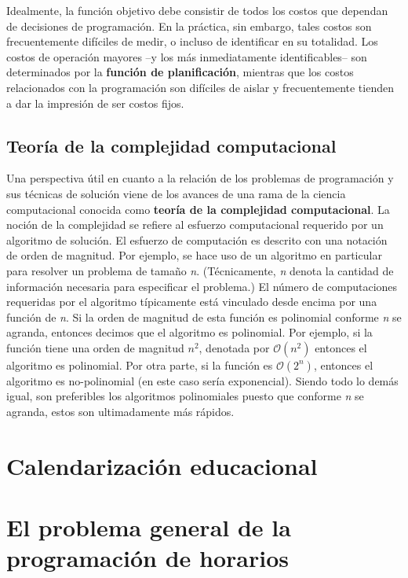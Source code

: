 \documentclass[draft,12pt,headsepline,footsepline,paper=letter]{scrreprt}
\newcommand{\BigO}{\ensuremath{\mathcal{O}}}%
\begin{document}
Idealmente, la función objetivo debe consistir de todos los costos que dependan de decisiones de programación. En la práctica, sin embargo, tales costos son frecuentemente difíciles de medir, o incluso de identificar en su totalidad. Los costos de operación mayores –y los más inmediatamente identificables– son determinados por la \textbf{función de planificación}, mientras que los costos relacionados con la programación son difíciles de aislar y frecuentemente tienden a dar la impresión de ser costos fijos.
%


\subsection{Teoría de la complejidad computacional} %
\label{sub:teoria_complejidad_computacional}

Una perspectiva útil en cuanto a la relación de los problemas de programación y sus técnicas de solución viene de los avances de una rama de la ciencia computacional conocida como \textbf{teoría de la complejidad computacional}. La noción de la complejidad se refiere al esfuerzo computacional requerido por un algoritmo de solución. El esfuerzo de computación es descrito con una notación de orden de magnitud.
%
Por ejemplo, se hace uso de un algoritmo en particular para resolver un problema de tamaño \textit{n}. (Técnicamente, \textit{n} denota la cantidad de información necesaria para especificar el problema.) El número de computaciones requeridas por el algoritmo típicamente está vinculado desde encima por una función de \textit{n}. Si la orden de magnitud de esta función es polinomial conforme \textit{n} se agranda, entonces decimos que el algoritmo es polinomial.
%
Por ejemplo, si la función tiene una orden de magnitud $\textit{n}^2$, denotada por $\BigO(\textit{n}^2)$ entonces el algoritmo es polinomial. Por otra parte, si la función es $\BigO(2^\textit{n})$, entonces el algoritmo es no-polinomial (en este caso sería exponencial). Siendo todo lo demás igual, son preferibles los algoritmos polinomiales puesto que conforme \textit{n} se agranda, estos son ultimadamente más rápidos.

\section{Calendarización educacional} %
\label{sec:calendarizacion_educacional}


\section{El problema general de la programación de horarios}
\label{sec:problema_general_programacion_horarios}
\end{document}
